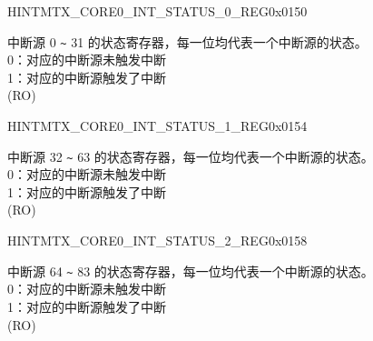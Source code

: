 \begin{register}{H}{INTMTX\_CORE0\_INT\_STATUS\_0\_REG}{0x0150}\label{regdesc:INTMTXCORE0INTSTATUS0REG}
%
\regnewline%
\begin{regdesc}\begin{reglist}
\label{fielddesc:INTMTXCORE0INTSTATUS0}\item [INTMTX\_CORE0\_INT\_STATUS\_0] 中断源 0 \verb+~+ 31 的状态寄存器，每一位均代表一个中断源的状态。\\
0：对应的中断源未触发中断\\
1：对应的中断源触发了中断\\ (RO)
\end{reglist}\end{regdesc}
\end{register}


\begin{register}{H}{INTMTX\_CORE0\_INT\_STATUS\_1\_REG}{0x0154}\label{regdesc:INTMTXCORE0INTSTATUS1REG}
%
\regnewline%
\begin{regdesc}\begin{reglist}
\label{fielddesc:INTMTXCORE0INTSTATUS1}\item [INTMTX\_CORE0\_INT\_STATUS\_1] 中断源 32 \verb+~+ 63 的状态寄存器，每一位均代表一个中断源的状态。\\
0：对应的中断源未触发中断\\
1：对应的中断源触发了中断\\ (RO)
\end{reglist}\end{regdesc}
\end{register}


\begin{register}{H}{INTMTX\_CORE0\_INT\_STATUS\_2\_REG}{0x0158}\label{regdesc:INTMTXCORE0INTSTATUS2REG}
%
%
\regnewline%
\begin{regdesc}\begin{reglist}
\label{fielddesc:INTMTXCORE0INTSTATUS2}\item [INTMTX\_CORE0\_INT\_STATUS\_2] 中断源 64 \verb+~+ 83 的状态寄存器，每一位均代表一个中断源的状态。\\
0：对应的中断源未触发中断\\
1：对应的中断源触发了中断\\ (RO)
\end{reglist}\end{regdesc}
\end{register}


